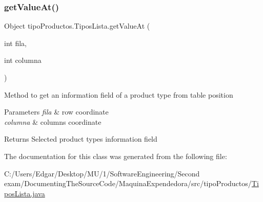 \subsubsection{\texorpdfstring{get\+Value\+At()}{getValueAt()}}
{\footnotesize\ttfamily Object tipo\+Productos.\+Tipos\+Lista.\+get\+Value\+At (\begin{DoxyParamCaption}\item[{int}]{fila,  }\item[{int}]{columna }\end{DoxyParamCaption})\hspace{0.3cm}{\ttfamily [inline]}}

Method to get an information field of a product type from table position 
\begin{DoxyParams}{Parameters}
{\em fila} & row coordinate \\
\hline
{\em columna} & columns coordinate \\
\hline
\end{DoxyParams}
\begin{DoxyReturn}{Returns}
Selected product type\textquotesingle{}s information field 
\end{DoxyReturn}


The documentation for this class was generated from the following file\+:\begin{DoxyCompactItemize}
\item 
C\+:/\+Users/\+Edgar/\+Desktop/\+M\+U/1/\+Software\+Engineering/\+Second exam/\+Documenting\+The\+Source\+Code/\+Maquina\+Expendedora/src/tipo\+Productos/\mbox{\hyperlink{_tipos_lista_8java}{Tipos\+Lista.\+java}}\end{DoxyCompactItemize}
